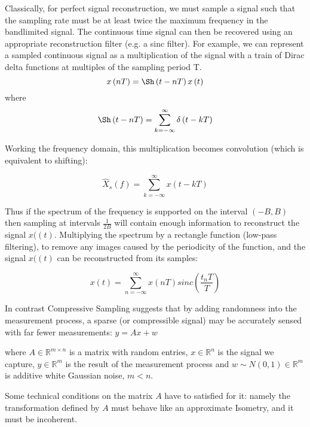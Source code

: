 Classically, for perfect signal reconstruction, we must sample a signal such that the sampling rate must be at least twice the maximum frequency in the bandlimited signal. The continuous time signal can then be recovered using an appropriate reconstruction filter (e.g. a sinc filter). For example, we can represent a sampled continuous signal as a multiplication of the signal with a train of Dirac delta functions at multiples of the sampling period T.
%
\begin{equation}
x\left(nT\right) = \Sh\left(t-nT\right)x\left(t\right)
\end{equation}
%
where
%
\begin{equation}
\Sh\left(t-nT\right) = \sum_{k=-\infty}^{\infty} \delta\left(t - kT\right)
\end{equation}

Working the frequency domain, this multiplication becomes convolution (which is equivalent to shifting):

\begin{equation}
\hat{X}_{s}\left(f\right) = \sum_{k=-\infty}^\infty x\left(t - kT\right)
\end{equation}

Thus if the spectrum of the frequency is supported on the interval \(\left(-B, B\right)\) then sampling at intervals \(\frac{1}{2B}\) will contain enough information to reconstruct the signal \(x(\left(t\right)\). Multiplying the spectrum by a rectangle function (low-pass filtering), to remove any images caused by the periodicity of the function, and the signal \(x(\left(t\right)\) can be reconstructed from its samples:

\begin{equation}
x\left(t\right) = \sum_{n=-\infty}^\infty x\left(nT\right) sinc\left(\frac{t_nT}{T}\right)
\end{equation}

In contrast Compressive Sampling suggests that by adding randomness into the measurement process, a sparse (or compressible signal) may be accurately sensed with far fewer measurements:
$y = Ax + w$

where \(A \in \mathbb{R}^{m \times n}\) is a matrix with random entries, \(x \in \mathbb{R}^n\) is the signal we capture, \(y \in \mathbb{R}^m\) is the result of the measurement process and \(w \sim N\left(0,1\right) \in \mathbb{R}^m\) is additive white Gaussian noise, \(m < n\).

Some technical conditions on the matrix \(A\) have to satisfied for it: namely the transformation defined by \(A\) must behave like an approximate Isometry, and it must be incoherent.

